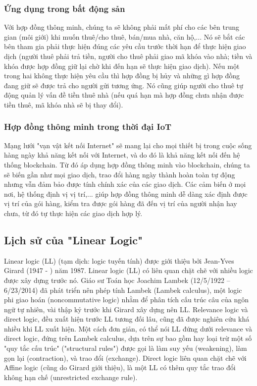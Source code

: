 \documentclass[a4paper]{article}
\begin{document}
\subsubsection{Ứng dụng trong bất động sản}
Với hợp đồng thông minh, chúng ta sẽ không phải mất phí cho các bên trung gian (môi giới) khi muốn thuê/cho thuê, bán/mua nhà, căn hộ,... Nó sẽ bắt các bên tham gia phải thực hiện đúng các yêu cầu trước thời hạn để thực hiện giao dịch (người thuê phải trả tiền, người cho thuê phải giao mã khóa vào nhà; tiền và khóa được hợp đồng giữ lại chờ khi đến hạn sẽ thực hiện giao dịch). Nếu một trong hai không thực hiện yêu cầu thì hợp đồng bị hủy và những gì hợp đồng đang giữ sẽ được trả cho người gửi tương ứng. Nó cũng giúp người cho thuê tự động quản lý vấn đề tiền thuê nhà (nếu quá hạn mà hợp đồng chưa nhận được tiền thuê, mã khóa nhà sẽ bị thay đổi).

\subsubsection{Hợp đồng thông minh trong thời đại IoT}
Mạng lưới "vạn vật kết nối Internet" sẽ mang lại cho mọi thiết bị trong cuộc sống hàng ngày khả năng kết nối với Internet, và do đó là khả năng kết nối đến hệ thống blockchain. Từ đó áp dụng hợp đồng thông minh vào blockchain, chúng ta sẽ biến gần như mọi giao dịch, trao đổi hàng ngày thành hoàn toàn tự động nhưng vẫn đảm bảo được tính chính xác của các giao dịch. Các cảm biến ở mọi nơi, hệ thống định vị vị trí,... giúp hợp đồng thông minh dễ dàng xác định được vị trí của gói hàng, kiểm tra được gói hàng đã đến vị trí của người nhận hay chưa, từ đó tự thực hiện các giao dịch hợp lý.

\subsection{Lịch sử của "Linear Logic"}
Linear logic (LL) (tạm dịch: logic tuyến tính) được giới thiệu bởi Jean-Yves Girard (1947 - ) năm 1987. Linear logic (LL) có liên quan chặt chẽ với nhiều logic được xây dựng trước nó. Giáo sư Toán học Joachim Lambek (12/5/1922 – 6/23/2014) đã phát triển nên phép tính Lambek (Lambek calculus), một logic phi giao hoán (noncommutative logic) nhằm để phân tích cấu trúc câu của ngôn ngữ tự nhiên, vài thập kỷ trước khi Girard xây dựng nên LL. Relevance logic và direct logic, đều xuất hiện trước LL tương đối lâu, cũng đã được nghiên cứu khá nhiều khi LL xuất hiện. Một cách đơn giản, có thể nói LL đứng dưới relevance và direct logic, đứng trên Lambek calculus, dựa trên sự bao gồm hay loại trừ một số "quy tắc cấu trúc" ("structural rules") được gọi là làm suy yếu (weakening), làm gọn lại (contraction), và trao đổi (exchange). Direct logic liên quan chặt chẽ với Affine logic (cũng do Girard giới thiệu), là một LL có thêm quy tắc trao đổi không hạn chế (unrestricted exchange rule).\\
\end{document}
